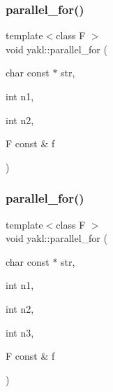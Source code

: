 \subsubsection{\texorpdfstring{parallel\+\_\+for()}{parallel\_for()}\hspace{0.1cm}{\footnotesize\ttfamily [10/16]}}
{\footnotesize\ttfamily template$<$class F $>$ \\
void yakl\+::parallel\+\_\+for (\begin{DoxyParamCaption}\item[{char const $\ast$}]{str,  }\item[{int}]{n1,  }\item[{int}]{n2,  }\item[{F const \&}]{f }\end{DoxyParamCaption})\hspace{0.3cm}{\ttfamily [inline]}}

\mbox{\label{namespaceyakl_a5070d09cae3de942302799314b43dbc4}} 
\subsubsection{\texorpdfstring{parallel\+\_\+for()}{parallel\_for()}\hspace{0.1cm}{\footnotesize\ttfamily [11/16]}}
{\footnotesize\ttfamily template$<$class F $>$ \\
void yakl\+::parallel\+\_\+for (\begin{DoxyParamCaption}\item[{char const $\ast$}]{str,  }\item[{int}]{n1,  }\item[{int}]{n2,  }\item[{int}]{n3,  }\item[{F const \&}]{f }\end{DoxyParamCaption})\hspace{0.3cm}{\ttfamily [inline]}}

\mbox{\label{namespaceyakl_a88376089821b56aa4d7ddabf6dfcbe51}} 
